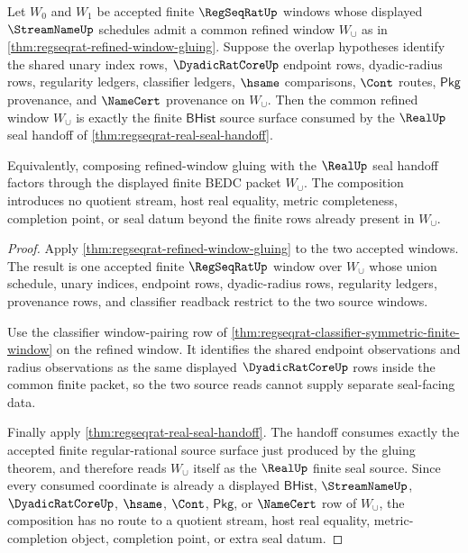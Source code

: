 \begin{theorem}
\label{thm:regseqrat-refined-window-gluing-real-seal-factorization}
Let $W_0$ and $W_1$ be accepted finite $\RegSeqRatUp$ windows whose displayed
$\StreamNameUp$ schedules admit a common refined window $W_\cup$ as in
\autoref{thm:regseqrat-refined-window-gluing}. Suppose the overlap hypotheses
identify the shared unary index rows, $\DyadicRatCoreUp$ endpoint rows,
dyadic-radius rows, regularity ledgers, classifier ledgers, $\hsame$
comparisons, $\Cont$ routes, $\mathsf{Pkg}$ provenance, and $\NameCert$
provenance on $W_\cup$. Then the common refined window $W_\cup$ is exactly the
finite $\mathsf{BHist}$ source surface consumed by the $\RealUp$ seal handoff
of \autoref{thm:regseqrat-real-seal-handoff}.

Equivalently, composing refined-window gluing with the $\RealUp$ seal handoff
factors through the displayed finite BEDC packet $W_\cup$. The composition
introduces no quotient stream, host real equality, metric completeness,
completion point, or seal datum beyond the finite rows already present in
$W_\cup$.
\end{theorem}
\begin{proof}
Apply \autoref{thm:regseqrat-refined-window-gluing} to the two accepted
windows. The result is one accepted finite $\RegSeqRatUp$ window over
$W_\cup$ whose union schedule, unary indices, endpoint rows, dyadic-radius
rows, regularity ledgers, provenance rows, and classifier readback restrict to
the two source windows.

Use the classifier window-pairing row of
\autoref{thm:regseqrat-classifier-symmetric-finite-window} on the refined window. It
identifies the shared endpoint observations and radius observations as the
same displayed $\DyadicRatCoreUp$ rows inside the common finite packet, so the
two source reads cannot supply separate seal-facing data.

Finally apply \autoref{thm:regseqrat-real-seal-handoff}. The handoff consumes
exactly the accepted finite regular-rational source surface just produced by
the gluing theorem, and therefore reads $W_\cup$ itself as the $\RealUp$ finite
seal source. Since every consumed coordinate is already a displayed
$\mathsf{BHist}$, $\StreamNameUp$, $\DyadicRatCoreUp$, $\hsame$, $\Cont$,
$\mathsf{Pkg}$, or $\NameCert$ row of $W_\cup$, the composition has no route to
a quotient stream, host real equality, metric-completion object, completion
point, or extra seal datum.
\end{proof}

